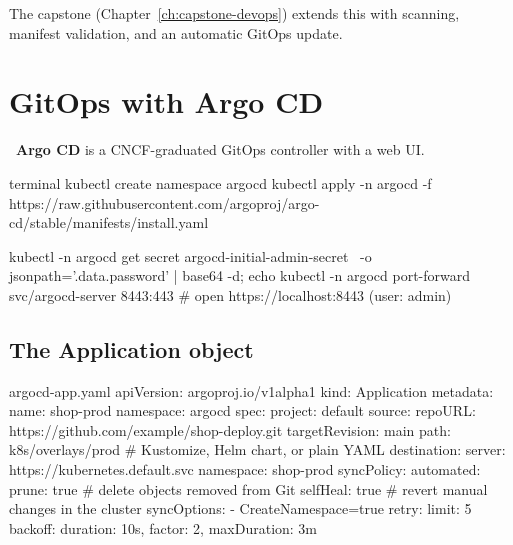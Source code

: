 
The capstone (Chapter~\ref{ch:capstone-devops}) extends this with scanning,
manifest validation, and an automatic GitOps update.

\section{GitOps with Argo CD}

~\textbf{Argo CD} is a CNCF-graduated GitOps controller with a
web UI.

\begin{bashcode}{terminal}
kubectl create namespace argocd
kubectl apply -n argocd -f https://raw.githubusercontent.com/argoproj/argo-cd/stable/manifests/install.yaml

kubectl -n argocd get secret argocd-initial-admin-secret \
  -o jsonpath='{.data.password}' | base64 -d; echo
kubectl -n argocd port-forward svc/argocd-server 8443:443
# open https://localhost:8443  (user: admin)
\end{bashcode}

\subsection{The Application object}

\begin{yamlcode}{argocd-app.yaml}
apiVersion: argoproj.io/v1alpha1
kind: Application
metadata:
  name: shop-prod
  namespace: argocd
spec:
  project: default
  source:
    repoURL: https://github.com/example/shop-deploy.git
    targetRevision: main
    path: k8s/overlays/prod          # Kustomize, Helm chart, or plain YAML
  destination:
    server: https://kubernetes.default.svc
    namespace: shop-prod
  syncPolicy:
    automated:
      prune: true                    # delete objects removed from Git
      selfHeal: true                 # revert manual changes in the cluster
    syncOptions:
      - CreateNamespace=true
    retry:
      limit: 5
      backoff: { duration: 10s, factor: 2, maxDuration: 3m }
\end{yamlcode}

